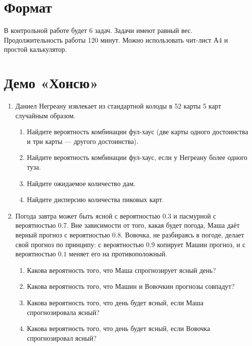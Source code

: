 \documentclass[12pt]{article}
\begin{document}
\section*{Формат}

В контрольной работе будет 6 задач. 
Задачи имеют равный вес. 
Продолжительность работы 120 минут. 
Можно использовать чит-лист А4 и простой калькулятор.

\section*{Демо «Хонсю»}
\begin{enumerate}

    \item %
    Даниел Негреану извлекает из стандартной колоды в 52 карты 5 карт случайным образом.
    \begin{enumerate}
        \item Найдите вероятность комбинации фул-хаус (две карты одного достоинства и три карты — другого достоинства).
        \item Найдите вероятность комбинации фул-хаус, если у Негреану более одного туза.
        \item Найдите ожидаемое количество дам.
        \item Найдите дисперсию количества пиковых карт. 
    \end{enumerate}

    \item %
    Погода завтра может быть ясной с вероятностью $0.3$ и пасмурной с вероятностью $0.7$. 
    Вне зависимости от того, какая будет погода, Маша даёт верный прогноз с вероятностью $0.8$. 
    Вовочка, не разбираясь в погоде, делает свой прогноз по принципу: с вероятностью $0.9$ копирует Машин прогноз, и с вероятностью $0.1$ меняет его на противоположный.
\begin{enumerate}
    \item Какова вероятность того, что Маша спрогнозирует ясный день?
    \item Какова вероятность того, что Машин и Вовочкин прогнозы совпадут?
    \item Какова вероятность того, что день будет ясный, если Маша спрогнозировала ясный?
    \item Какова вероятность того, что день будет ясный, если Вовочка спрогнозировал ясный?
\end{enumerate}




\end{enumerate}
\end{document}
